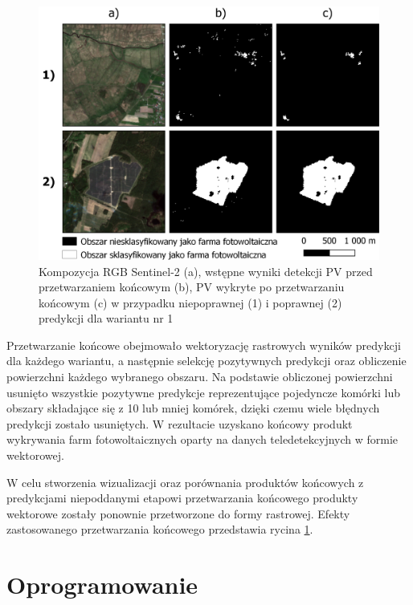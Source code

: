 \documentclass{amuthesis}
\begin{document}
\begin{figure}[t]

{\centering \includegraphics[width=1\textwidth,height=\textheight]{figures/postprocessing_pl.png}

}

\caption{\label{fig-rycina-post-processing}Kompozycja RGB Sentinel-2
(a), wstępne wyniki detekcji PV przed przetwarzaniem końcowym (b), PV
wykryte po przetwarzaniu końcowym (c) w przypadku niepoprawnej (1) i
poprawnej (2) predykcji dla wariantu nr 1}

\end{figure}

Przetwarzanie końcowe obejmowało wektoryzację rastrowych wyników
predykcji dla każdego wariantu, a następnie selekcję pozytywnych
predykcji oraz obliczenie powierzchni każdego wybranego obszaru. Na
podstawie obliczonej powierzchni usunięto wszystkie pozytywne predykcje
reprezentujące pojedyncze komórki lub obszary składające się z 10 lub
mniej komórek, dzięki czemu wiele błędnych predykcji zostało usuniętych.
W rezultacie uzyskano końcowy produkt wykrywania farm fotowoltaicznych
oparty na danych teledetekcyjnych w formie wektorowej.

W celu stworzenia wizualizacji oraz porównania produktów końcowych z
predykcjami niepoddanymi etapowi przetwarzania końcowego produkty
wektorowe zostały ponownie przetworzone do formy rastrowej. Efekty
zastosowanego przetwarzania końcowego przedstawia rycina
\ref{fig-rycina-post-processing}.

\hypertarget{oprogramowanie}{%
\section{Oprogramowanie}\label{oprogramowanie}}
\end{document}
